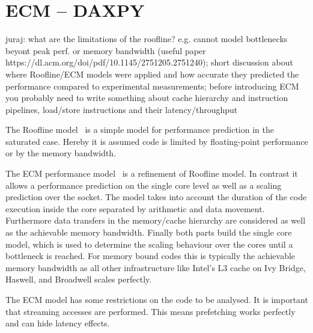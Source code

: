 \section{ECM -- DAXPY}
\label{sec:epm}

{\color{blue} juraj: what are the limitations of the roofline? e.g. cannot model bottlenecks beyont peak perf. or memory bandwidth (useful paper https://dl.acm.org/doi/pdf/10.1145/2751205.2751240); short discussion about where Roofline/ECM models were applied and how accurate they predicted the performance compared to experimental measurements; before introducing ECM you probably need to write something about cache hierarchy and instruction pipelines, load/store instructions and their latency/throughput}

{\color{orange} The Roofline model~\cite{williams-2009} is a simple model
for performance prediction in the saturated case.
Hereby it is assumed code is limited by floating-point performance or by the
memory bandwidth.

The ECM performance model~\cite{treibig-2010-ecm,hager-2012-ecm} is a refinement
of Roofline model. 
In contrast it allows a performance prediction on the single core level as well
as a scaling prediction over the socket.
The model takes into account the duration of the code execution inside the core
separated by arithmetic and data movement.
Furthermore data transfers in the memory/cache hierarchy are considered as well
as the achievable memory bandwidth.
%
Finally both parts build the single core model, which is used to determine the
scaling behaviour over the cores until a bottleneck is reached. 
%
For memory bound codes this is typically the achievable memory bandwidth as all
other infrastructure like Intel's L3 cache on Ivy Bridge, Haswell, and Broadwell
scales perfectly. 

The ECM model has some restrictions on the code to be analysed.
It is important that streaming accesses are performed. This means prefetching
works perfectly and can hide latency effects.}

